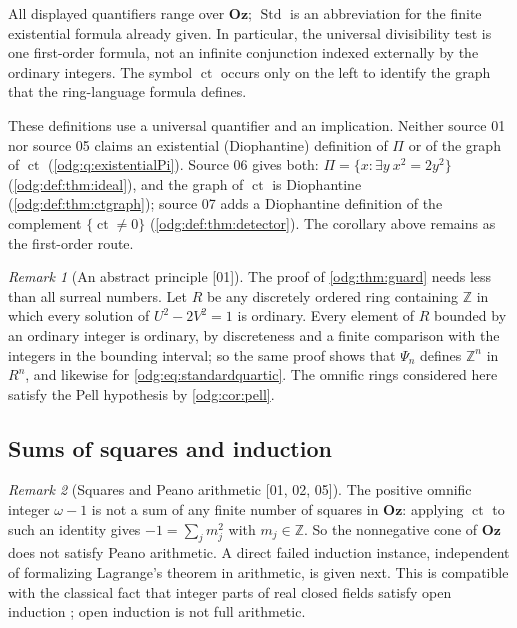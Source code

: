 \documentclass[11pt,oneside]{article}
\numberwithin{equation}{section}
\theoremstyle{definition}
\theoremstyle{remark}
\newtheorem{remark}[remark]{Remark}
\newcommand{\Oz}{\mathbf{Oz}}
\newcommand{\Z}{\mathbb Z}
\newcommand{\ct}{\operatorname{ct}}
\newcommand{\Std}{\operatorname{Std}}
\newcommand{\src}[1]{\textup{\textsf{\small[#1]}}}
\begin{document}
All displayed quantifiers range over $\Oz$; $\Std$ is an abbreviation for
the finite existential formula already given. In particular, the universal
divisibility test is one first-order formula, not an infinite conjunction
indexed externally by the ordinary integers. The symbol $\ct$ occurs only
on the left to identify the graph that the ring-language formula defines.

These definitions use a universal quantifier and an implication. Neither
source 01 nor source 05 claims an existential (Diophantine) definition of $\Pi$
or of the graph of $\ct$ (\cref{odg:q:existentialPi}). Source 06 gives both:
$\Pi=\{x:\exists y\ x^2=2y^2\}$ (\cref{odg:def:thm:ideal}), and the graph of
$\ct$ is Diophantine (\cref{odg:def:thm:ctgraph}); source 07 adds a
Diophantine definition of the complement $\{\ct\ne0\}$
(\cref{odg:def:thm:detector}). The corollary above remains as the first-order
route.

\begin{remark}[An abstract principle \src{01}]\label{odg:rem:abstractguard}
The proof of \cref{odg:thm:guard} needs less than all surreal numbers. Let
$R$ be any discretely ordered ring containing $\Z$ in which every solution of
$U^2-2V^2=1$ is ordinary. Every element of $R$ bounded by an ordinary integer
is ordinary, by discreteness and a finite comparison with the integers in the
bounding interval; so the same proof shows that $\Psi_n$ defines $\Z^n$ in
$R^n$, and likewise for \eqref{odg:eq:standardquartic}. The omnific rings
considered here satisfy the Pell hypothesis by \cref{odg:cor:pell}.
\end{remark}

\subsection{Sums of squares and induction}

\begin{remark}[Squares and Peano arithmetic \src{01, 02, 05}]\label{odg:rem:foursquares}
The positive omnific integer $\omega-1$ is not a sum of any finite number of
squares in $\Oz$: applying $\ct$ to such an identity gives
$-1=\sum_j m_j^2$ with $m_j\in\Z$. So the nonnegative cone of $\Oz$ does not
satisfy Peano arithmetic. A direct failed induction instance, independent of
formalizing Lagrange's theorem in arithmetic, is given next. This is
compatible with the classical fact that integer parts of real closed fields
satisfy open induction \cite{Shepherdson,LM}; open induction is not full
arithmetic.
\end{remark}
\end{document}
